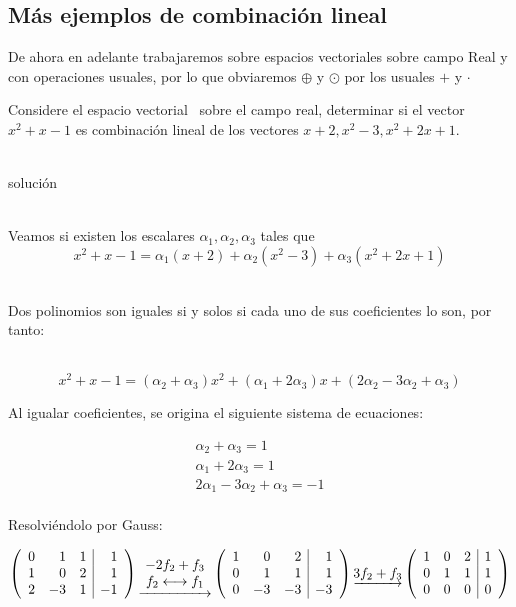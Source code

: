 \subsection{M\'as ejemplos de combinación lineal}

De ahora en adelante trabajaremos sobre espacios vectoriales sobre campo Real y con operaciones usuales, por lo que obviaremos $\oplus$ y $\odot$ por los usuales $+$ y $\cdot$

\begin{ejemplo}
Considere el espacio vectorial \pdos\ sobre el campo real, determinar si el vector $x^2+x-1$ es combinación lineal de los vectores $x+2, x^2-3, x^2+2x+1$.
\end{ejemplo}
~\\
solución

~\\
Veamos si existen los escalares $\alpha_1, \alpha_2, \alpha_3$ tales que
\[x^2+x-1=\alpha_1\left(x+2\right)+
\alpha_2\left(x^2-3\right)+
\alpha_3\left(x^2+2x+1\right)
\]

~\\
Dos polinomios son iguales si y solos si cada uno de sus coeficientes lo son, por tanto:

~\\
\[x^2+x-1=\left(\alpha_2+\alpha_3\right)x^2+
\left(\alpha_1+2\alpha_3\right)x+
\left(2\alpha_2-3\alpha_2+\alpha_3\right)
\]

Al igualar coeficientes, se origina el siguiente sistema de ecuaciones:

\begin{eqnarray*}
\alpha_2+\alpha_3=1\\
\alpha_1+2\alpha_3=1\\
2\alpha_1-3\alpha_2+\alpha_3=-1\\
\end{eqnarray*}

Resolviéndolo por Gauss:

\[
\reducir{rrr|r}{
0 &1 &1 &1\\
1&0&2&1\\
2 &-3&1&-1
}
\underrightarrow{\begin{array}{c}
    -2f_2 + f_3\\
    f_2 \longleftrightarrow f_1
\end{array}}
\reducir{rrr|r}{
1 &0 &2 &1\\
0&1&1&1\\
0 &-3&-3&-3
}
\underrightarrow{3f_2 + f_3}
\reducir{rrr|r}{
1 &0 &2 &1\\
0&1&1&1\\
0 &0&0&0
}\]

